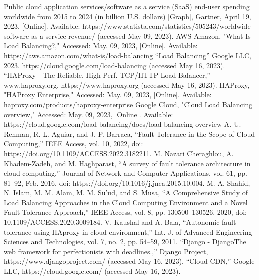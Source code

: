 \documentclass[lettersize,journal]{IEEEtran}
\begin{document}
\clearpage
\newpage
\begin{thebibliography}{1}

%
 Public cloud application services/software as a service (SaaS) end-user spending worldwide from 2015 to 2024 (in billion U.S. dollars) [Graph], Gartner, April 19, 2023. [Online]. Available: https://www.statista.com/statistics/505243/worldwide-software-as-a-service-revenue/ (accessed May 09, 2023).
 AWS Amazon, "What Is Load Balancing?," Accessed: May. 09, 2023, [Online]. Available: https://aws.amazon.com/what-is/load-balancing
 “Load Balancing” Google LLC, 2023. https://cloud.google.com/load-balancing (accessed May 16, 2023).
 “HAProxy - The Reliable, High Perf. TCP/HTTP Load Balancer,” www.haproxy.org. https://www.haproxy.org (accessed May 16, 2023).
 HAProxy, "HAProxy Enterprise," Accessed: May. 09, 2023, [Online]. Available: haproxy.com/products/haproxy-enterprise
 Google Cloud, "Cloud Load Balancing overview," Accessed: May. 09, 2023, [Online]. Available: https://cloud.google.com/load-balancing/docs/load-balancing-overview
A. U. Rehman, R. L. Aguiar, and J. P. Barraca, “Fault-Tolerance in the Scope of Cloud Computing,” IEEE Access, vol. 10, 2022, doi: https://doi.org/10.1109/ACCESS.2022.3182211.
 M. Nazari Cheraghlou, A. Khadem-Zadeh, and M. Haghparast, “A survey of fault tolerance architecture in cloud computing,” Journal of Network and Computer Applications, vol. 61, pp. 81–92, Feb. 2016, doi: https://doi.org/10.1016/j.jnca.2015.10.004.
M. A. Shahid, N. Islam, M. M. Alam, M. M. Su’ud, and S. Musa, “A Comprehensive Study of Load Balancing Approaches in the Cloud Computing Environment and a Novel Fault Tolerance Approach,” IEEE Access, vol. 8, pp. 130500–130526, 2020, doi: 10.1109/ACCESS.2020.3009184.
 V. Kaushal and A. Bala, “Autonomic fault tolerance using HAproxy in cloud environment,” Int. J. of Advanced Engineering Sciences and Technologies, vol. 7, no. 2, pp. 54–59, 2011.
 “Django - DjangoThe web framework for perfectionists with deadlines.,” Django Project, https://www.djangoproject.com/ (accessed May 16, 2023). 
 “Cloud CDN,” Google LLC, https://cloud.google.com/ (accessed May 16, 2023).


\end{thebibliography}
\clearpage
\newpage
\appendix
\end{document}
